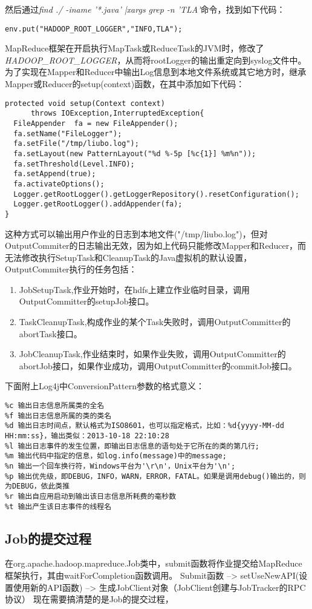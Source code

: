 然后通过\textsl{find ./ -iname '*.java' |xargs grep -n 'TLA'}命令，找到如下代码：
\begin{verbatim}
env.put("HADOOP_ROOT_LOGGER","INFO,TLA");
\end{verbatim}
\par MapReduce框架在开启执行MapTask或ReduceTask的JVM时，修改了\textsl{HADOOP\_ROOT\_LOGGER}，从而将rootLogger的输出重定向到syslog文件中。为了实现在Mapper和Reducer中输出Log信息到本地文件系统或其它地方时，继承Mapper或Reducer的setup(context)函数，在其中添加如下代码：
\begin{verbatim}
protected void setup(Context context) 
      throws IOException,InterruptedException{
  FileAppender  fa = new FileAppender();
  fa.setName("FileLogger");
  fa.setFile("/tmp/liubo.log");
  fa.setLayout(new PatternLayout("%d %-5p [%c{1}] %m%n"));
  fa.setThreshold(Level.INFO);
  fa.setAppend(true);
  fa.activateOptions();
  Logger.getRootLogger().getLoggerRepository().resetConfiguration();
  Logger.getRootLogger().addAppender(fa);
}
\end{verbatim}
\par 这种方式可以输出用户作业的日志到本地文件("/tmp/liubo.log")，但对OutputCommiter的日志输出无效，因为如上代码只能修改Mapper和Reducer，而无法修改执行SetupTask和CleanupTask的Java虚拟机的默认设置，OutputCommiter执行的任务包括：
\begin{enumerate}[(1)]
\item JobSetupTask,作业开始时，在hdfs上建立作业临时目录，调用OutputCommitter的setupJob接口。
\item TaskCleanupTask,构成作业的某个Task失败时，调用OutputCommitter的abortTask接口。
\item JobCleanupTask,作业结束时，如果作业失败，调用OutputCommitter的abortJob接口，如果作业成功，调用OutputCommitter的commitJob接口。
\end{enumerate}
\par 下面附上Log4j中ConversionPattern参数的格式意义：
\begin{verbatim}
%c 输出日志信息所属类的全名
%f 输出日志信息所属的类的类名
%d 输出日志时间点，默认格式为ISO8601，也可以指定格式，比如：%d{yyyy-MM-dd HH:mm:ss}，输出类似：2013-10-18 22:10:28
%l 输出日志事件的发生位置，即输出日志信息的语句处于它所在的类的第几行;
%m 输出代码中指定的信息，如log.info(message)中的message;
%n 输出一个回车换行符，Windows平台为'\r\n'，Unix平台为'\n';
%p 输出优先级，即DEBUG，INFO，WARN，ERROR，FATAL。如果是调用debug()输出的，则为DEBUG，依此类推
%r 输出自应用启动到输出该日志信息所耗费的毫秒数
%t 输出产生该日志事件的线程名
\end{verbatim}
\subsection{Job的提交过程}
在org.apache.hadoop.mapreduce.Job类中，submit函数将作业提交给MapReduce框架执行，其由waitForCompletion函数调用。
Submit函数 --> setUseNewAPI(设置使用新的API函数) --> 生成JobClient对象（JobClient创建与JobTracker的RPC协议）
现在需要搞清楚的是Job的提交过程，




